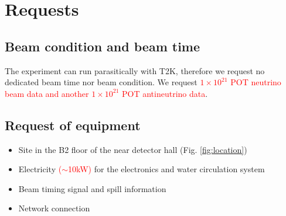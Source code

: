 \section{Requests}
\subsection{Beam condition and beam time}
The experiment can run parasitically with T2K, therefore we request no dedicated beam time nor beam condition.
We request \textcolor{red}{$1 \times 10^{21}$ POT neutrino beam data and another $1 \times 10^{21}$ POT antineutrino data}.

\subsection{Request of equipment}
\begin{itemize}
\item Site in the B2 floor of the near detector hall (Fig. \ref{fig:location})
\item Electricity \textcolor{red}{($\sim$10kW)} for the electronics and water circulation system
\item Beam timing signal and spill information
\item Network connection
\end{itemize}
